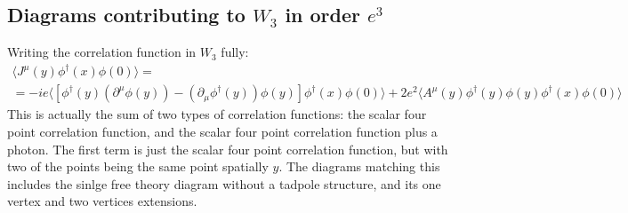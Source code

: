 \documentclass{article}
\begin{document}
\subsection{Diagrams contributing to $W_3$ in order $e^3$}
Writing the correlation function in $W_3$ fully:
\begin{equation}
\begin{gathered}
    \langle J^\mu(y)\phi^\dagger(x)\phi(0) \rangle = \\ =
    -ie \langle\left[\phi^\dagger(y)(\partial^\mu\phi(y)) - (\partial_\mu\phi^\dagger(y))\phi(y)\right] \phi^\dagger(x)\phi(0) \rangle +
    2e^2\langle A^\mu(y)\phi^\dagger(y)\phi(y)\phi^\dagger(x)\phi(0) \rangle
\end{gathered}
\end{equation}
This is actually the sum of two types of correlation functions: the scalar four point correlation function, and the scalar four point correlation function plus a photon.
\newline
The first term is just the scalar four point correlation function, but with two of the points being the same point spatially $y$. The diagrams matching this includes the sinlge free theory diagram without a tadpole structure, and its one vertex and two vertices extensions.
\end{document}
